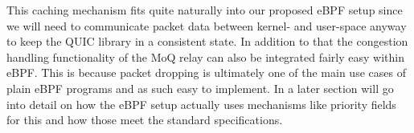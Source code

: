 This caching mechanism fits quite naturally into our proposed eBPF setup since we will need to 
communicate packet data between kernel- and user-space anyway to keep the QUIC library in a 
consistent state.
In addition to that the congestion handling functionality of the MoQ relay can also
be integrated fairly easy within eBPF\@.
This is because packet dropping is ultimately one of the main use cases of plain eBPF 
programs and as such easy to implement.
In a later section will go into detail on how the eBPF setup actually uses mechanisms like 
priority fields for this and how those meet the standard specifications.
